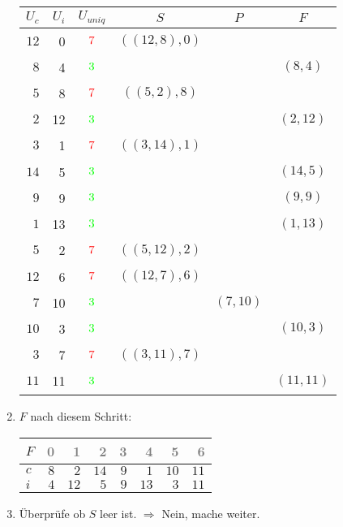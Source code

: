 \begin{enumerate}
\begin{center}
\small\begin{tabular}{rrcccc}
\toprule 
 $U_c$ & $U_i$ & $U_{uniq}$ &     $S$      &   $P$   &   $F$   \\
\midrule 
$12$ & 0 & $$\xmarkc$$ & $((12, 8), 0)$ &       &       \\
$ 8$ & 4 & $$\cmarkc$$  &            &       & $( 8, 4)$\\
$ 5$ & 8 & $$\xmarkc$$ & $(( 5, 2), 8)$ &       &       \\
$ 2$ & 12 & $$\cmarkc$$  &            &       & $( 2,12)$\\
$ 3$ & 1 & $$\xmarkc$$ & $(( 3,14), 1)$ &       &       \\
$14$ & 5 & $$\cmarkc$$  &            &       & $(14, 5)$\\
$ 9$ & 9 & $$\cmarkc$$  &            &       & $( 9, 9)$\\
$ 1$ & 13 & $$\cmarkc$$  &            &       & $( 1,13)$\\
$ 5$ & 2 & $$\xmarkc$$ & $(( 5,12), 2)$ &       &       \\
$12$ & 6 & $$\xmarkc$$ & $((12, 7), 6)$ &       &       \\
$ 7$ & 10 & $$\cmarkc$$  &            & $( 7,10)$ &       \\
$10$ & 3 & $$\cmarkc$$  &            &       & $(10, 3)$\\
$ 3$ & 7 & $$\xmarkc$$ & $(( 3,11), 7)$ &       &       \\
$11$ & 11 & $$\cmarkc$$  &            &       & $(11,11)$\\
\bottomrule 
\end{tabular}
\end{center}
\item 
$F$ nach diesem Schritt:
\begin{center}
\small\begin{tabular}{lrrrrrrr}
    \toprule 
    $F$ & \textcolor{gray}{0} & \textcolor{gray}{1} & \textcolor{gray}{2} & \textcolor{gray}{3} & \textcolor{gray}{4} & \textcolor{gray}{5} & \textcolor{gray}{6}\\
    \midrule 
    $c$ & $8$ & $2$ & $14$ & $9$ & $1$ & $10$ & $11$ \\
    $i$ & $4$ & $12$ & $5$ & $9$ & $13$ & $3$ & $11$ \\
    \bottomrule 
\end{tabular}
\end{center}

\item 
Überprüfe ob $S$ leer ist.
$\Rightarrow$ Nein, mache weiter.


\end{enumerate}
